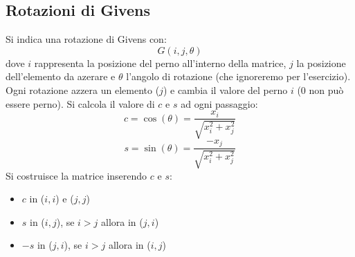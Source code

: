 \documentclass[10pt]{article}
\begin{document}
\subsection{Rotazioni di Givens}
Si indica una rotazione di Givens con:
\begin{equation*}
    G(i,j,\theta)
\end{equation*}
dove $i$ rappresenta la posizione del perno all'interno della matrice, $j$ la posizione dell'elemento da azerare e $\theta$ l'angolo di rotazione (che ignoreremo per l'esercizio). Ogni rotazione azzera un elemento ($j$) e cambia il valore del perno $i$ (0 non può essere perno). Si calcola il valore di $c$ e $s$ ad ogni passaggio:
\begin{equation*}
    c = \cos(\theta)=\frac{x_{i}}{\sqrt{x_{i}^{2}+x_{j}^{2}}}
\end{equation*}
\begin{equation*}
    s = \sin(\theta)=\frac{-x_{j}}{\sqrt{x_{i}^{2}+x_{j}^{2}}}
\end{equation*}
Si costruisce la matrice inserendo $c$ e $s$:
\begin{itemize}
    \item $c$ in ($i,i$) e ($j,j$)
    \item $s$ in ($i,j$), se $i>j$ allora in ($j,i$)
    \item $-s$ in ($j,i$), se $i>j$ allora in ($i,j$)
\end{itemize}
\end{document}

